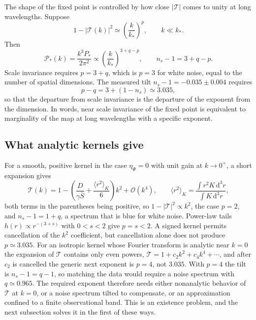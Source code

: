 \documentclass[11pt]{article}
\theoremstyle{definition}
\theoremstyle{remark}
\newcommand{\dd}{\mathrm{d}}
\newcommand{\TT}{\mathcal{T}}
\newcommand{\Sb}{\bar{S}}
\newcommand{\Pk}{\mathcal{P}}
\begin{document}
The shape of the fixed point is controlled by how close $|\TT|$ comes to unity at long wavelengths. Suppose
\begin{equation}
1-|\TT(k)|^2\simeq\left(\frac k{k_*}\right)^p,\qquad k\ll k_*.
\label{eq:marginal}
\end{equation}
Then
\begin{equation}
\Pk_*(k)=\frac{k^3P_*}{2\pi^2}\propto\left(\frac k{k_*}\right)^{3+q-p},\qquad n_s-1=3+q-p.
\label{eq:nsp}
\end{equation}
Scale invariance requires $p=3+q$, which is $p=3$ for white noise, equal to the number of spatial dimensions. The measured tilt $n_s-1=-0.035\pm0.004$ requires
\begin{equation}
p-q=3+(1-n_s)\simeq3.035,
\end{equation}
so that the departure from scale invariance is the departure of the exponent from the dimension. In words, near scale invariance of the fixed point is equivalent to marginality of the map at long wavelengths with a specific exponent.

\subsection{What analytic kernels give}

For a smooth, positive kernel in the case $\eta_\Phi=0$ with unit gain at $k\to0^+$, a short expansion gives
\begin{equation}
\TT(k)=1-\left(\frac D{\gamma\Sb}+\frac{\langle r^2\rangle_K}{6}\right)k^2+\mathcal O(k^4),\qquad\langle r^2\rangle_K=\frac{\int r^2K\,\dd^3r}{\int K\,\dd^3r},
\end{equation}
both terms in the parentheses being positive, so $1-|\TT|^2\propto k^2$, the case $p=2$, and $n_s-1=1+q$, a spectrum that is blue for white noise. Power-law tails $h(r)\propto r^{-(3+s)}$ with $0<s<2$ give $p=s<2$. A signed kernel permits cancellation of the $k^2$ coefficient, but cancellation alone does not produce $p\simeq3.035$. For an isotropic kernel whose Fourier transform is analytic near $k=0$ the expansion of $\TT$ contains only even powers, $\TT=1+c_2k^2+c_4k^4+\cdots$, and after $c_2$ is cancelled the generic next exponent is $p=4$, not $3.035$. With $p=4$ the tilt is $n_s-1=q-1$, so matching the data would require a noise spectrum with $q\simeq0.965$. The required exponent therefore needs either nonanalytic behavior of $\TT$ at $k=0$, or a noise spectrum tilted to compensate, or an approximation confined to a finite observational band. This is an existence problem, and the next subsection solves it in the first of these ways.
\end{document}
